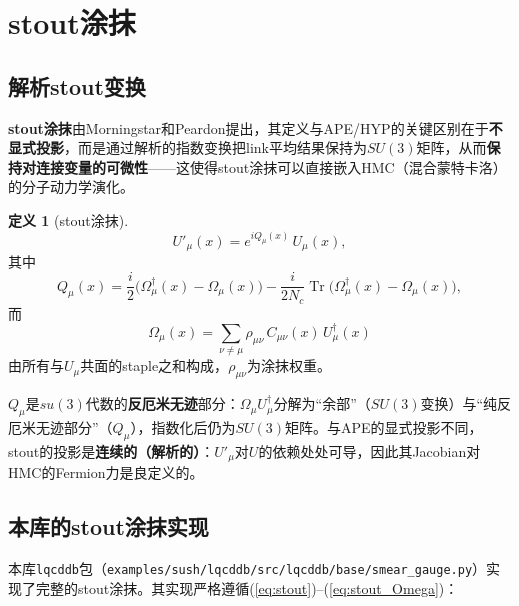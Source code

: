 \documentclass[12pt,a4paper]{ctexart}
\theoremstyle{definition}
\newtheorem{definition}{定义}[section]
\begin{document}
\section{stout涂抹}

\subsection{解析stout变换}

\textbf{stout涂抹}由Morningstar和Peardon提出\cite{Morningstar2004}，其定义与APE/HYP的关键区别在于\textbf{不显式投影}，而是通过解析的指数变换把link平均结果保持为$SU(3)$矩阵，从而\textbf{保持对连接变量的可微性}——这使得stout涂抹可以直接嵌入HMC（混合蒙特卡洛）的分子动力学演化。

\begin{definition}[stout涂抹]
\begin{equation}
\boxed{U'_\mu(x) = e^{iQ_\mu(x)}\, U_\mu(x)},
\label{eq:stout}
\end{equation}
其中
\begin{equation}
Q_\mu(x) = \frac{i}{2}\Big( \Omega_\mu^\dagger(x) - \Omega_\mu(x) \Big) - \frac{i}{2N_c}\operatorname{Tr}\Big( \Omega_\mu^\dagger(x) - \Omega_\mu(x) \Big),
\label{eq:stout_Q}
\end{equation}
而
\begin{equation}
\Omega_\mu(x) = \sum_{\nu \ne \mu} \rho_{\mu\nu}\, C_{\mu\nu}(x)\, U^\dagger_\mu(x)
\label{eq:stout_Omega}
\end{equation}
由所有与$U_\mu$共面的staple之和构成，$\rho_{\mu\nu}$为涂抹权重。
\end{definition}

$Q_\mu$是$su(3)$代数的\textbf{反厄米无迹}部分：$\Omega_\mu U^\dagger_\mu$分解为``余部''（$SU(3)$变换）与``纯反厄米无迹部分''（$Q_\mu$），指数化后仍为$SU(3)$矩阵。与APE的显式投影不同，stout的投影是\textbf{连续的（解析的）}：$U'_\mu$对$U$的依赖处处可导，因此其Jacobian对HMC的Fermion力是良定义的。

\subsection{本库的stout涂抹实现}

本库\texttt{lqcddb}包（\texttt{examples/sush/lqcddb/src/lqcddb/base/smear\_gauge.py}）实现了完整的stout涂抹。其实现严格遵循(\ref{eq:stout})–(\ref{eq:stout_Omega})：
\end{document}
